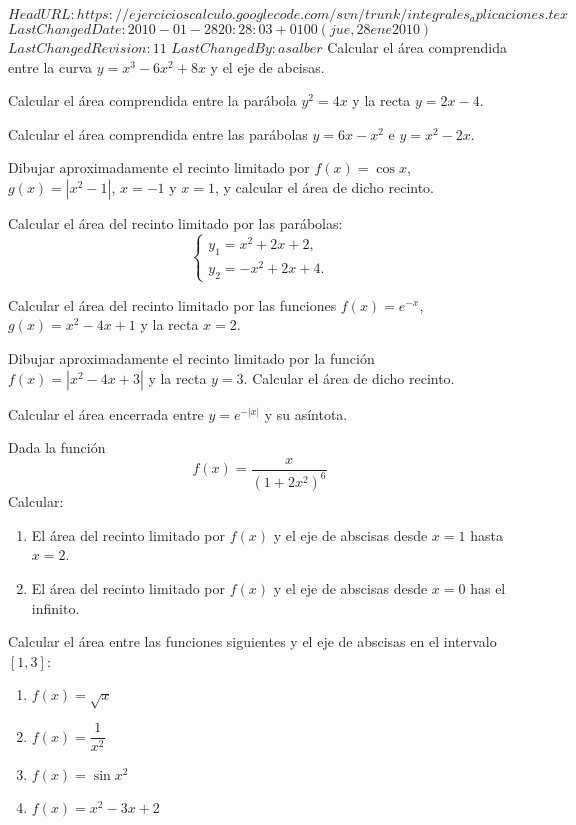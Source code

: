 \svnidlong
{$HeadURL: https://ejercicioscalculo.googlecode.com/svn/trunk/integrales_aplicaciones.tex $}
{$LastChangedDate: 2010-01-28 20:28:03 +0100 (jue, 28 ene 2010) $}
{$LastChangedRevision: 11 $}
{$LastChangedBy: asalber $}
%
{Calcular el área comprendida entre la curva $y=x^{3}-6x^{2}+8x$ y el eje de abcisas.
}


{Calcular el área comprendida entre la parábola $y^{2}=4x$ y la recta $y=2x-4$.
}


{Calcular el área comprendida entre las parábolas $y=6x-x^{2}$ e $y=x^{2}-2x.$
}


{Dibujar aproximadamente el recinto limitado por $f(x)=\cos x$, $g(x)=|x^2-1|$, $x=-1$ y $x=1$, y calcular el área de dicho recinto. 
}


{Calcular el área del recinto limitado por las parábolas:
\[
\left\{
\begin{array}{l}
y_1 = x^2+2x+2,\\
y_2 = -x^2+2x+4.
\end{array}
\right.
\]
}


{Calcular el área del recinto limitado por las funciones $f(x)= e^{-x}$, $g(x)=x^2-4x+1$ y la recta $x=2$.
}


{Dibujar aproximadamente el recinto limitado por la función $f(x)=\left| x^{2}-4x+3\right|$ y la recta $y=3.$ Calcular el área de dicho recinto.
}


{Calcular el área encerrada entre $y=e^{-\left|x\right| }$ y su asíntota.
}


{Dada la función 
\[
f(x)=\frac{x}{(1+2x^2)^6}
\]
Calcular:
\begin{enumerate}
\item El área del recinto limitado por $f(x)$ y el eje de abscisas desde $x=1$ hasta $x=2$.
\item El área del recinto limitado por $f(x)$ y el eje de abscisas desde $x=0$ has el infinito.
\end{enumerate}
}


{Calcular el área entre las funciones siguientes y el eje de abscisas en el intervalo $[1,3]$:
\begin{multicols}{2}
\begin{enumerate}\setlength{\itemsep}{3mm}
\item $f(x)=\sqrt{x}$
\item $f(x)=\dfrac{1}{x^2}$
\item $f(x)=\sin x^2$
\item $f(x)=x^2-3x+2$
\end{enumerate}
\end{multicols}
}


